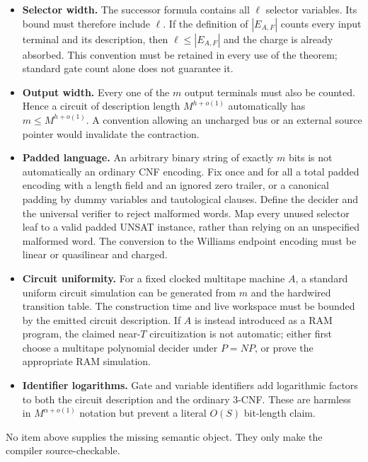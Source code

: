 \documentclass[11pt]{article}
\begin{document}
\begin{itemize}
\item[] \textbf{Selector width.}
The successor formula contains all $\ell$ selector variables.  Its bound must
therefore include $\ell$.  If the definition of $|E_{A,F}|$ counts every
input terminal and its description, then $\ell\le |E_{A,F}|$ and the charge
is already absorbed.  This convention must be retained in every use of the
theorem; standard gate count alone does not guarantee it.

\item[] \textbf{Output width.}
Every one of the $m$ output terminals must also be counted.  Hence a circuit
of description length $M^{h+o(1)}$ automatically has
$m\le M^{h+o(1)}$.  A convention allowing an uncharged bus or an external
source pointer would invalidate the contraction.

\item[] \textbf{Padded language.}
An arbitrary binary string of exactly $m$ bits is not automatically an
ordinary CNF encoding.  Fix once and for all a total padded encoding with a
length field and an ignored zero trailer, or a canonical padding by dummy
variables and tautological clauses.  Define the decider and the universal
verifier to reject malformed words.  Map every unused selector leaf to a
valid padded UNSAT instance, rather than relying on an unspecified malformed
word.  The conversion to the Williams endpoint encoding must be linear or
quasilinear and charged.

\item[] \textbf{Circuit uniformity.}
For a fixed clocked multitape machine $A$, a standard uniform circuit
simulation can be generated from $m$ and the hardwired transition table.
The construction time and live workspace must be bounded by the emitted
circuit description.  If $A$ is instead introduced as a RAM program, the
claimed near-$T$ circuitization is not automatic; either first choose a
multitape polynomial decider under $P=NP$, or prove the appropriate RAM
simulation.

\item[] \textbf{Identifier logarithms.}
Gate and variable identifiers add logarithmic factors to both the circuit
description and the ordinary 3-CNF.  These are harmless in
$M^{\alpha+o(1)}$ notation but prevent a literal $O(S)$ bit-length claim.
\end{itemize}

No item above supplies the missing semantic object.  They only make the
compiler source-checkable.
\end{document}
